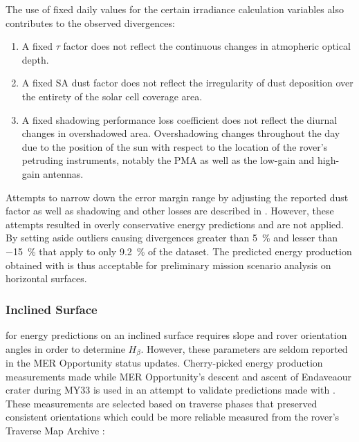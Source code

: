 

The use of fixed daily values for the certain irradiance calculation variables also contributes to the observed divergences:

\begin{enumerate}[label=\textcolor{BulletBlue}{(\alph*)}]
  \item A fixed $\tau$ factor does not reflect the continuous changes in atmopheric optical depth.
  \item A fixed \ac{SA} dust factor does not reflect the irregularity of dust deposition over the entirety of the solar cell coverage area.
  \item A fixed shadowing performance loss coefficient does not reflect the diurnal changes in overshadowed area. Overshadowing changes throughout the day due to the position of the sun with respect to the location of the rover's petruding instruments, notably the \ac{PMA} as well as the low-gain and high-gain antennas.
\end{enumerate}

Attempts to narrow down the error margin range by adjusting the reported dust factor as well as shadowing and other losses are described in . However, these attempts resulted in overly conservative energy predictions and are not applied. By setting aside outliers causing divergences greater than \SI{5}{\percent} and lesser than \SI{-15}{\percent} that apply to only \SI{9.2}{\percent} of the dataset. The predicted energy production obtained with  is thus acceptable for preliminary mission scenario analysis on horizontal surfaces.

\subsubsection{Inclined Surface}
\label{sec:PowerAndEnergyPredictions:Validation:InclinedSurface}

 for energy predictions on an inclined surface requires slope and rover orientation angles in order to determine $H_{\beta}$. However, these parameters are seldom reported in the \ac{MER} Opportunity status updates. Cherry-picked energy production measurements made while \ac{MER} Opportunity's descent and ascent of Endaveaour crater during \ac{MY}33 is used in an attempt to validate predictions made with . These measurements are selected based on traverse phases that preserved consistent orientations which could be more reliable measured from the rover's Traverse Map Archive :

